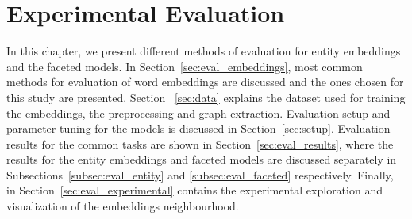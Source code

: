 \chapter{Experimental Evaluation}
\label{chap:eval}
In this chapter, we present different methods of evaluation for entity embeddings and the faceted models. In Section~\ref{sec:eval_embeddings}, most common methods for evaluation of word embeddings are discussed and the ones chosen for this study are presented. Section ~\ref{sec:data} explains the dataset used for training the embeddings, the preprocessing and graph extraction. Evaluation setup and parameter tuning for the models is discussed in Section~\ref{sec:setup}. Evaluation results for the common tasks are shown in Section~\ref{sec:eval_results}, where the results for the entity embeddings and faceted models are discussed separately in Subsections~\ref{subsec:eval_entity} and \ref{subsec:eval_faceted} respectively. Finally, in Section~\ref{sec:eval_experimental} contains the experimental exploration and visualization of the embeddings neighbourhood. 
